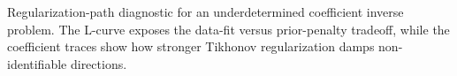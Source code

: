\caption{Regularization-path diagnostic for an underdetermined coefficient inverse problem. The L-curve exposes the data-fit versus prior-penalty tradeoff, while the coefficient traces show how stronger Tikhonov regularization damps non-identifiable directions.}\label{fig:regularization-path-expanded}
